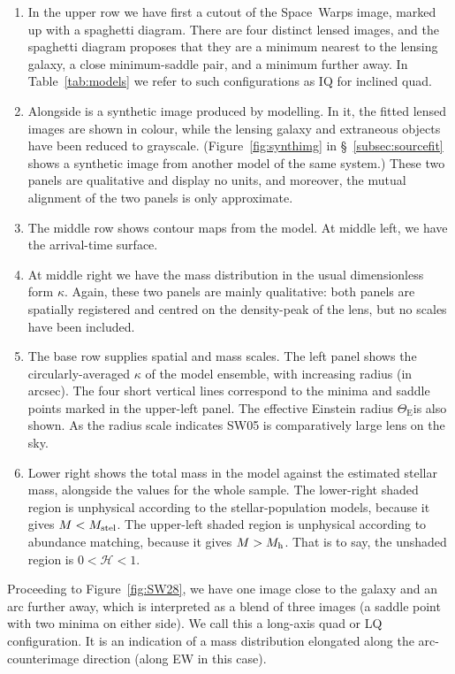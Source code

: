 \documentclass[fleqn,usenatbib]{mnras}
\newcommand{\figref}[1]{\ref{fig:#1}}
\newcommand{\Mstel}{M_{\rm stel}}
\newcommand{\Mhalo}{M_{\rm h}}
\newcommand{\haloindex}{\mathcal{H}}
\newcommand{\ER}{$\Theta_{\text{E}}$} %
\begin{document}
\begin{enumerate}
\item In the upper row we have first a cutout of the Space~Warps
  image, marked up with a spaghetti diagram.  There are four distinct
  lensed images, and the spaghetti diagram proposes that they are a
  minimum nearest to the lensing galaxy, a close minimum-saddle pair,
  and a minimum further away. In Table~\ref{tab:models} we refer to
  such configurations as IQ for inclined quad.
\item Alongside is a synthetic image produced by modelling.  In it,
  the fitted lensed images are shown in colour, while the lensing
  galaxy and extraneous objects have been reduced to grayscale.
  (Figure~\figref{synthimg} in \S~\ref{subsec:sourcefit} shows a
  synthetic image from another model of the same system.) These two
  panels are qualitative and display no units, and moreover, the
  mutual alignment of the two panels is only approximate.
\item The middle row shows contour maps from the model.  At middle
  left, we have the arrival-time surface.
\item At middle right we have the mass distribution in the usual
  dimensionless form $\kappa$.  Again, these two panels are mainly
  qualitative: both panels are spatially registered and centred on the
  density-peak of the lens, but no scales have been included.
\item The base row supplies spatial and mass scales.  The left panel
  shows the circularly-averaged $\kappa$ of the model ensemble, with
  increasing radius (in arcsec).  The four short vertical lines
  correspond to the minima and saddle points marked in the upper-left
  panel.  The effective Einstein radius \ER is also shown.  As the radius
  scale indicates SW05 is comparatively large lens on the
  sky.
\item Lower right shows the total mass in the model against the
  estimated stellar mass, alongside the values for the whole sample.
  The lower-right shaded region is unphysical according to the
  stellar-population models, because it gives $M<\Mstel$. The
  upper-left shaded region is unphysical according to abundance
  matching, because it gives $M>\Mhalo$.  That is to say, the unshaded
  region is $0<\haloindex<1$.
\end{enumerate}

Proceeding to Figure~\figref{SW28}, we have one image close to the
galaxy and an arc further away, which is interpreted as a blend of
three images (a saddle point with two minima on either side).  We call
this a long-axis quad or LQ configuration.  It is an indication of a
mass distribution elongated along the arc-counterimage direction
(along EW in this case).
\end{document}
